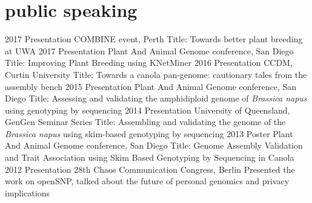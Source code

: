 \documentclass[]{friggeri-cv} %
\begin{document}
\section{public speaking}
\begin{entrylist}
\entry
{2017}
{Presentation}
{COMBINE event, Perth}
{Title: Towards better plant breeding at UWA}
\entry
{2017}
{Presentation}
{Plant And Animal Genome conference, San Diego}
{Title: Improving Plant Breeding using KNetMiner}
\entry
{2016}
{Presentation}
{CCDM, Curtin University}
{Title: Towards a canola pan-genome: cautionary tales from the assembly bench}
\entry
{2015}
{Presentation}
{Plant And Animal Genome conference, San Diego}
{Title: Assessing and validating the amphidiploid genome of \textit{Brassica napus} using genotyping by sequencing}
\entry
{2014}
{Presentation}
{University of Queensland, GenGen Seminar Series}
{Title: Assembling and validating the genome of the \textit{Brassica napus} using skim-based genotyping by sequencing}
\entry
{2013}
{Poster}
{Plant And Animal Genome conference, San Diego}
{Title: Genome Assembly Validation and Trait Association using Skim Based Genotyping by Sequencing in Canola}
\entry
{2012}
{Presentation}
{28th Chaos Communication Congress, Berlin}
{Presented the work on openSNP, talked about the future of personal genomics and privacy implications}
\end{entrylist}
\end{document}

